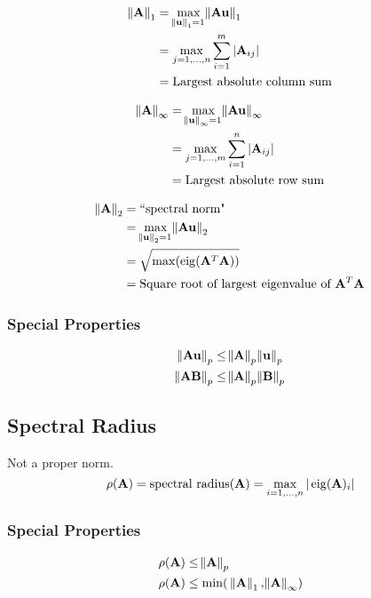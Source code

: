 \begin{align}
\norm{\mathbf{A}}_1
  &=\max_{\norm{\mathbf{u}}_1=1} \norm{\mathbf{A}\mathbf{u}}_1       \\
  &=\max_{j=1,\ldots,n} \sum_{i=1}^m |\mathbf{A}_{ij}| \\
  &=\textrm{Largest absolute column sum}
\end{align}

\begin{align}
\norm{\mathbf{A}}_\infty
  &=\max_{\norm{\mathbf{u}}_\infty=1} \norm{\mathbf{A}\mathbf{u}}_\infty  \\
  &=\max_{j=1,\ldots,m} \sum_{i=1}^n |\mathbf{A}_{ij}| \\
  &=\textrm{Largest absolute row sum}
\end{align}

\begin{align}
\norm{\mathbf{A}}_2
  &=\textrm{``spectral norm"}                   \\
  &=\max_{\norm{\mathbf{u}}_2=1} \norm{\mathbf{A}\mathbf{u}}_2       \\
  &=\sqrt{\max(\operatorname{eig}(\mathbf{A}^T\mathbf{A}))} \\
  &=\textrm{Square root of largest eigenvalue of~}\mathbf{A}^T\mathbf{A}
\end{align}



\subsubsection{Special Properties}
\begin{align}
\norm{\mathbf{A}\mathbf{u}}_p &\le \norm{\mathbf{A}}_p \norm{\mathbf{u}}_p \\
\norm{\mathbf{A}\mathbf{B}}_p &\le \norm{\mathbf{A}}_p \norm{\mathbf{B}}_p 
\end{align}

\subsection{Spectral Radius}
Not a proper norm.
\begin{equation}
\rho(\mathbf{A})=\textrm{spectral radius}(\mathbf{A})=\max_{i=1,\ldots,n} | \operatorname{eig}(\mathbf{A})_i |
\end{equation}

\subsubsection{Special Properties}
\begin{align}
\rho(\mathbf{A}) &\le \norm{\mathbf{A}}_p \\
\rho(\mathbf{A}) &\le \min(~\norm{\mathbf{A}}_1, \norm{\mathbf{A}}_\infty)
\end{align}


